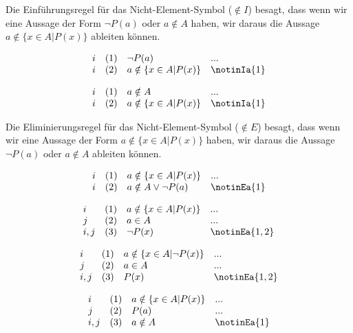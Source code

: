 \documentclass{book}
\theoremstyle{plain}
\theoremstyle{remark}
\theoremstyle{definition}
\begin{document}
Die Einführungsregel für das Nicht-Element-Symbol (\(\notin I\)) besagt, dass wenn wir eine Aussage der Form \(\neg P(a)\) oder \(a \notin A\) haben, wir daraus die Aussage \(a \notin \{x\in A | P(x)\}\) ableiten können.

\[
\begin{array}{llll}
	i & (1) & \neg P(a) & ... \\
	i & (2) & a \notin \{x \in A| P(x)\} & \notinIa{1} \\
\end{array}
\]

\[
\begin{array}{llll}
	i & (1) & a \notin A & ... \\
	i & (2) & a \notin \{x \in A| P(x)\} & \notinIa{1} \\
\end{array}
\]

Die Eliminierungsregel für das Nicht-Element-Symbol (\(\notin E\)) besagt, dass wenn wir eine Aussage der Form \(a \notin \{x\in A | P(x)\}\) haben, wir daraus die Aussage \(\neg P(a)\) oder \(a \notin A\) ableiten können.

\[
\begin{array}{llll}
	i & (1) & a \notin \{x\in A | P(x)\} & ... \\
	i & (2) & a\notin A\lor \neg P(a) & \notinEa{1} \\
\end{array}
\]

\[
\begin{array}{llll}
	i & (1) & a \notin \{x\in A | P(x)\} & ... \\
	j & (2) & a\in A & ... \\
        i,j & (3) & \neg P(x) & \notinEa{1,2} \\
\end{array}
\]

\[
\begin{array}{llll}
	i & (1) & a \notin \{x\in A | \neg P(x)\} & ... \\
	j & (2) & a\in A & ... \\
        i,j & (3) & P(x) & \notinEa{1,2} \\
\end{array}
\]

\[
\begin{array}{llll}
	i & (1) & a \notin \{x\in A | P(x)\} & ... \\
	j & (2) & P(a) & ... \\
        i,j & (3) & a\notin A & \notinEa{1} \\
\end{array}
\]
\end{document}
